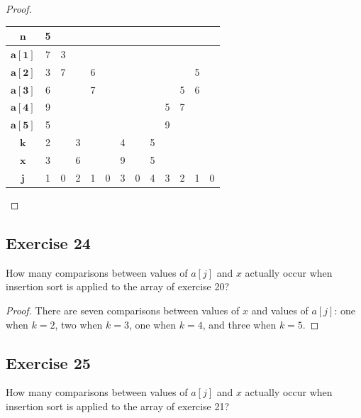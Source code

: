 \documentclass[14pt]{extarticle}
\begin{document}
\begin{proof}
    \begin{center}
        \begin{tabular}{|c|c|c|c|c|c|c|c|c|c|c|c|c|}
            \hline
            \(\bm{n}\)    & 5 &   &   &   &   &   &   &   &   &   &   &   \\
            \hline
            \(\bm{a[1]}\) & 7 & 3 &   &   &   &   &   &   &   &   &   &   \\
            \hline
            \(\bm{a[2]}\) & 3 & 7 &   & 6 &   &   &   &   &   &   & 5 &   \\
            \hline
            \(\bm{a[3]}\) & 6 &   &   & 7 &   &   &   &   &   & 5 & 6 &   \\
            \hline
            \(\bm{a[4]}\) & 9 &   &   &   &   &   &   &   & 5 & 7 &   &   \\
            \hline
            \(\bm{a[5]}\) & 5 &   &   &   &   &   &   &   & 9 &   &   &   \\
            \hline
            \(\bm{k}\)    & 2 &   & 3 &   &   & 4 &   & 5 &   &   &   &   \\
            \hline
            \(\bm{x}\)    & 3 &   & 6 &   &   & 9 &   & 5 &   &   &   &   \\
            \hline
            \(\bm{j}\)    & 1 & 0 & 2 & 1 & 0 & 3 & 0 & 4 & 3 & 2 & 1 & 0 \\
            \hline
        \end{tabular}
    \end{center}
\end{proof}

\subsection{Exercise 24}
How many comparisons between values of \(a[j]\) and \(x\) actually occur when insertion sort is applied to the array of
exercise 20?

\begin{proof}
    There are seven comparisons between values of \(x\) and values of \(a[j]\): one when \(k = 2\), two when \(k = 3\), one when
    \(k = 4\), and three when \(k = 5\).
\end{proof}

\subsection{Exercise 25}
How many comparisons between values of \(a[j]\) and \(x\) actually occur when insertion sort is applied to the array of
exercise 21?
\end{document}
